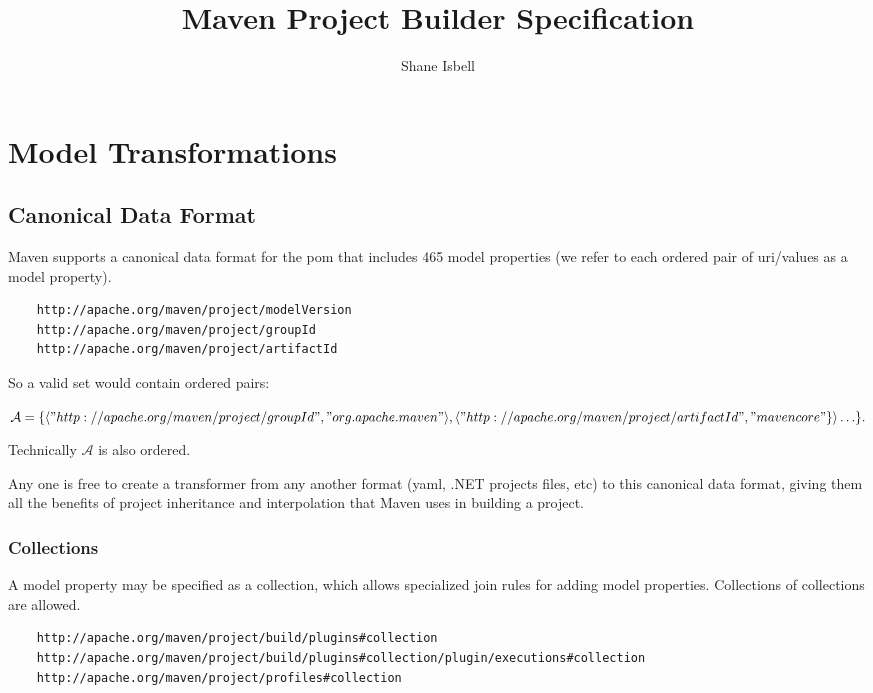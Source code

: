 \documentclass[12pt]{amsart}
\title{Maven Project Builder Specification}
\author{Shane Isbell}
\begin{document}
\maketitle
\tableofcontents
\section{Model Transformations}
\subsection{Canonical Data Format}
Maven supports a canonical data format for the pom that includes 465 model properties (we refer to each ordered pair of uri/values as a model property). 

\begin{verbatim}
	http://apache.org/maven/project/modelVersion
	http://apache.org/maven/project/groupId
	http://apache.org/maven/project/artifactId
\end{verbatim}

So a valid set would contain ordered pairs:

\begin{math}
	\mathcal{A}= \{\langle "http://apache.org/maven/project/groupId", "org.apache.maven"\rangle,   
	\langle "http://apache.org/maven/project/artifactId", "mavencore"\}\rangle \ldots\}.
\end{math}

Technically \begin{math}\mathcal{A}\end{math} is also ordered.

Any one is free to create a transformer from any another format (yaml, .NET projects files, etc) to this canonical data format, giving them all the benefits of project inheritance and interpolation that Maven uses in building a project.

\subsubsection{Collections}
A model property may  be specified as a collection, which allows specialized join rules for adding model properties. Collections of collections are allowed.
\begin{verbatim}
	http://apache.org/maven/project/build/plugins#collection
	http://apache.org/maven/project/build/plugins#collection/plugin/executions#collection
	http://apache.org/maven/project/profiles#collection
\end{verbatim}
  
\end{document}
